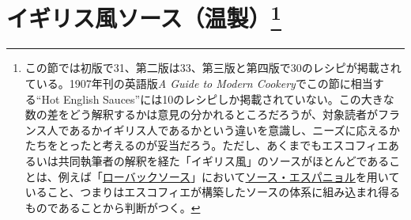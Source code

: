 \href{未、原文対照チェック}{} \href{未、日本語表現校正}{}
\href{未、その他修正}{} \href{未、原稿最終校正}{}

\hypertarget{ux30a4ux30aeux30eaux30b9ux98a8ux30bdux30fcux30b9ux6e29ux88fd24}{%
\section[イギリス風ソース（温製）]{\texorpdfstring{イギリス風ソース（温製）\footnote{この節では初版で31、第二版は33、第三版と第四版で30のレシピが掲載されている。1907年刊の英語版\emph{A
  Guide to Modern Cookery}でこの節に相当する``Hot English
  Sauces''には10のレシピしか掲載されていない。この大きな数の差をどう解釈するかは意見の分かれるところだろうが、対象読者がフランス人であるかイギリス人であるかという違いを意識し、ニーズに応えるかたちをとったと考えるのが妥当だろう。ただし、あくまでもエスコフィエあるいは共同執筆者の解釈を経た「イギリス風」のソースがほとんどであることは、例えば「\protect\hyperlink{roe-buck-sauce}{ローバックソース}」において\protect\hyperlink{sauce-espagnole}{ソース・エスパニョル}を用いていること、つまりはエスコフィエが構築したソースの体系に組み込まれ得るものであることから判断がつく。}}{イギリス風ソース（温製）}}\label{ux30a4ux30aeux30eaux30b9ux98a8ux30bdux30fcux30b9ux6e29ux88fd24}}



